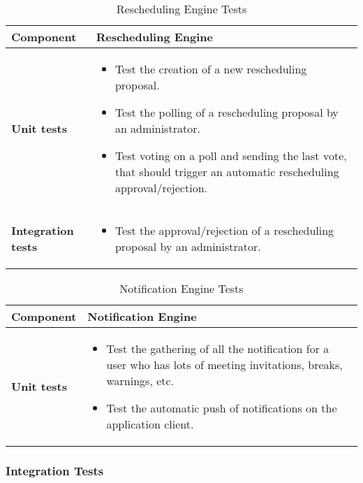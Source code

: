 \begin{table}[H]	
	\centering
	\def\arraystretch{1.5}
	\begin{tabular}{|m{4cm}|m{12cm}|}
		\hline
		\textbf{Component} & Rescheduling Engine \\ \hline
		\textbf{Unit tests} & 
			\begin{itemize}
			\item Test the creation of a new rescheduling proposal.
			\item Test the polling of a rescheduling proposal by an administrator.
			\item Test voting on a poll and sending the last vote, that should trigger an automatic rescheduling approval/rejection.
			\end{itemize} \\ \hline
		\textbf{Integration tests} & 
			\begin{itemize}
			\item Test the approval/rejection of a rescheduling proposal by an administrator.
			\end{itemize} \\ \hline
	\end{tabular}
	\caption{Rescheduling Engine Tests}
\end{table}

\begin{table}[H]	
	\centering
	\def\arraystretch{1.5}
	\begin{tabular}{|m{4cm}|m{12cm}|}
		\hline
		\textbf{Component} & Notification Engine \\ \hline
		\textbf{Unit tests} & 
			\begin{itemize}
			\item Test the gathering of all the notification for a user who has lots of meeting invitations, breaks, warnings, etc.
			\item Test the automatic push of notifications on the application client.
			\end{itemize} \\ \hline
	\end{tabular}
	\caption{Notification Engine Tests}
\end{table}

\subsubsection{Integration Tests}

